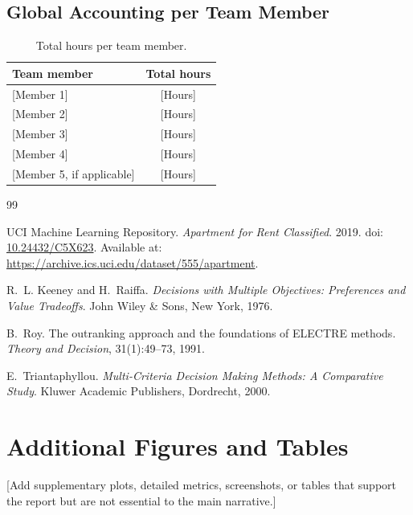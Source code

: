 \documentclass[12pt,a4paper]{report}
\begin{document}
\section{Global Accounting per Team Member}
\begin{table}[H]
\centering
\caption{Total hours per team member.}
\label{tab:hours}
\begin{tabular}{lc}
\toprule
\textbf{Team member} & \textbf{Total hours}\\
\midrule
{[Member 1]} & [Hours]\\
{[Member 2]} & [Hours]\\
{[Member 3]} & [Hours]\\
{[Member 4]} & [Hours]\\
{[Member 5, if applicable]} & [Hours]\\
\bottomrule
\end{tabular}
\end{table}

\begin{thebibliography}{99}

UCI Machine Learning Repository.
\textit{Apartment for Rent Classified}. 2019.
doi: \href{https://doi.org/10.24432/C5X623}{10.24432/C5X623}.
Available at:
\url{https://archive.ics.uci.edu/dataset/555/apartment}.

R.~L. Keeney and H.~Raiffa.
\textit{Decisions with Multiple Objectives: Preferences and Value
Tradeoffs}. John Wiley \& Sons, New York, 1976.

B.~Roy.
The outranking approach and the foundations of ELECTRE methods.
\textit{Theory and Decision}, 31(1):49--73, 1991.

E.~Triantaphyllou.
\textit{Multi-Criteria Decision Making Methods: A Comparative Study}.
Kluwer Academic Publishers, Dordrecht, 2000.

\end{thebibliography}

\appendix
\chapter{Additional Figures and Tables}
[Add supplementary plots, detailed metrics, screenshots, or tables that support the report but are not essential to the main narrative.]
\end{document}
